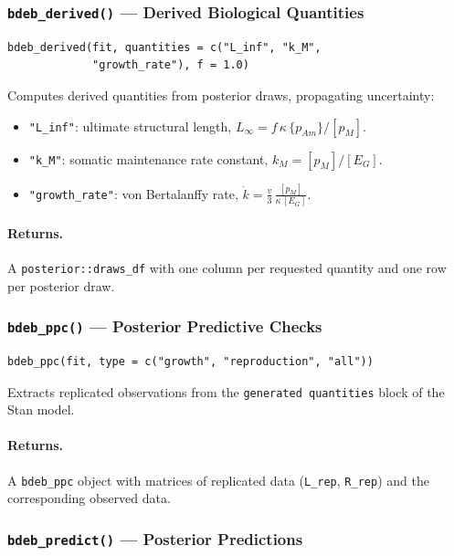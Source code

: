 \documentclass[11pt,a4paper]{article}
\newcommand{\fn}[1]{\texttt{#1()}}
\newcommand{\code}[1]{\texttt{#1}}
\begin{document}
\subsubsection{\fn{bdeb\_derived} --- Derived Biological Quantities}

\begin{lstlisting}
bdeb_derived(fit, quantities = c("L_inf", "k_M",
             "growth_rate"), f = 1.0)
\end{lstlisting}

Computes derived quantities from posterior draws, propagating uncertainty:
\begin{itemize}[nosep]
  \item \code{"L\_inf"}: ultimate structural length, $L_\infty = f\,\kappa\,\{p_{Am}\} / [p_M]$.
  \item \code{"k\_M"}: somatic maintenance rate constant, $k_M = [p_M] / [E_G]$.
  \item \code{"growth\_rate"}: von Bertalanffy rate, $\dot{k} = \frac{v}{3}\,\frac{[p_M]}{\kappa\,[E_G]}$.
\end{itemize}

\paragraph{Returns.} A \code{posterior::draws\_df} with one column per
requested quantity and one row per posterior draw.

\subsubsection{\fn{bdeb\_ppc} --- Posterior Predictive Checks}

\begin{lstlisting}
bdeb_ppc(fit, type = c("growth", "reproduction", "all"))
\end{lstlisting}

Extracts replicated observations from the \code{generated quantities}
block of the Stan model.

\paragraph{Returns.} A \code{bdeb\_ppc} object with matrices of
replicated data (\code{L\_rep}, \code{R\_rep}) and the corresponding
observed data.

\subsubsection{\fn{bdeb\_predict} --- Posterior Predictions}
\end{document}
